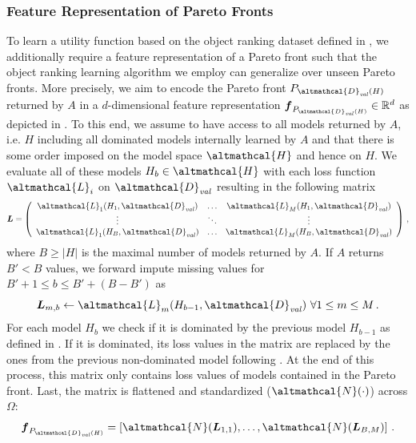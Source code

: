 \subsubsection*{Feature Representation of Pareto Fronts}
To learn a utility function based on the object ranking dataset defined in , we additionally require a feature representation of a Pareto front such that the object ranking learning algorithm we employ can generalize over unseen Pareto fronts.
More precisely, we aim to encode the Pareto front $P_{\altmathcal{D}_\mathit{val}(H)}$ returned by $A$ in a $d$-dimensional feature representation $\vec{f}_{P_{\altmathcal{D}_\mathit{val}(H)}} \in \mathbb{R}^d$ as depicted in . To this end, we assume to have access to all models returned by $A$, i.e. $H$ including all dominated models internally learned by $A$ and that there is some order imposed on the model space $\altmathcal{H}$ and hence on $H$. We evaluate all of these models $H_b \in \altmathcal{H}$ with each loss function $\altmathcal{L}_i$ on $\altmathcal{D}_\mathit{val}$ resulting in the following matrix
\begin{equation}
    \vec{L} = \left( \begin{array}{ccc}
         \altmathcal{L}_1(H_1,\altmathcal{D}_{\mathit{val}}) & \ldots & \altmathcal{L}_M(H_1,\altmathcal{D}_{\mathit{val}}) \\
         \vdots & \ddots & \vdots \\
         \altmathcal{L}_1(H_B,\altmathcal{D}_{\mathit{val}}) & \ldots & \altmathcal{L}_M(H_B,\altmathcal{D}_{\mathit{val}}) \\
    \end{array} \right) \, ,
\end{equation}
where $B \geq \vert H \vert$ is the maximal number of models returned by $A$. If $A$ returns $B' < B$ values, we forward impute missing values for $B' + 1 \leq b \leq B' + (B - B')$ as 
\begin{equation}\label{moo-eq:replace_dominated}
    \vec{L}_{m,b} \leftarrow \altmathcal{L}_m(H_{b-1},\altmathcal{D}_{\mathit{val}}) ~ \forall 1 \leq m \leq M \, . 
\end{equation}
For each model $H_b$ we check if it is dominated by the previous model $H_{b-1}$ as defined in . If it is dominated, its loss values in the matrix are replaced by the ones from the previous non-dominated model following .
At the end of this process, this matrix only contains loss values of 
models contained in the Pareto front.
Last, the matrix is flattened and standardized ($\altmathcal{N}(\cdot)$) across $\Omega$: 
\begin{equation}\label{moo-eq:feature_representation}
    \vec{f}_{P_{\altmathcal{D}_\mathit{val}(H)}} = \left[ \altmathcal{N}(\vec{L}_{1,1}), 
    \ldots, \altmathcal{N}(\vec{L}_{B,M}) \right] \, .
\end{equation}

